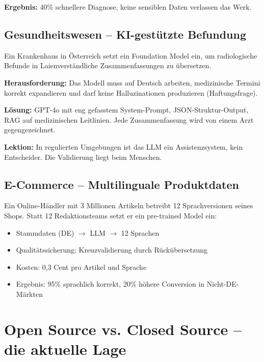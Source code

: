 \textbf{Ergebnis:} 40\% schnellere Diagnose, keine sensiblen Daten verlassen das Werk.

\subsection{Gesundheitswesen -- KI-gestützte Befundung}

Ein Krankenhaus in Österreich setzt ein Foundation Model ein, um radiologische Befunde in Laienverständliche Zusammenfassungen zu übersetzen.

\textbf{Herausforderung:} Das Modell muss auf Deutsch arbeiten, medizinische Termini korrekt expandieren und darf keine Halluzinationen produzieren (Haftungsfrage).

\textbf{Lösung:} GPT-4o mit eng gefasstem System-Prompt, JSON-Struktur-Output, RAG auf medizinischen Leitlinien. Jede Zusammenfassung wird von einem Arzt gegengezeichnet.

\textbf{Lektion:} In regulierten Umgebungen ist das LLM ein Assistenzsystem, kein Entscheider. Die Validierung liegt beim Menschen.

\subsection{E-Commerce -- Multilinguale Produktdaten}

Ein Online-Händler mit 3 Millionen Artikeln betreibt 12 Sprachversionen seines Shops. Statt 12 Redaktionsteams setzt er ein pre-trained Model ein:

\begin{itemize}[leftmargin=*]
    \item Stammdaten (DE) $\rightarrow$ LLM $\rightarrow$ 12 Sprachen
    \item Qualitätssicherung: Kreuzvalidierung durch Rückübersetzung
    \item Kosten: 0,3 Cent pro Artikel und Sprache
    \item Ergebnis: 95\% sprachlich korrekt, 20\% höhere Conversion in Nicht-DE-Märkten
\end{itemize}

\section{Open Source vs. Closed Source -- die aktuelle Lage}

